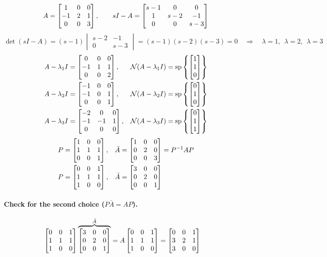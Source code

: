 \begin{example}
\[
A=\begin{bmatrix}1&0&0\\-1&2&1\\0&0&3\end{bmatrix},\qquad sI-A=\begin{bmatrix}s-1&0&0\\1&s-2&-1\\0&0&s-3\end{bmatrix}
\]
\[
\det(sI-A)=(s-1)\begin{vmatrix}s-2&-1\\0&s-3\end{vmatrix} = (s-1)(s-2)(s-3)=0
\quad\Rightarrow\quad \lambda=1,\ \ \lambda=2,\ \ \lambda=3
\]
\begin{align*}
A-\lambda_1 I &= \begin{bmatrix}0&0&0\\-1&1&1\\0&0&2\end{bmatrix}, & \mathcal{N}(A-\lambda_1 I)&=\operatorname{sp}\left\{\begin{bmatrix}1\\1\\0\end{bmatrix}\right\}\\
A-\lambda_2 I &= \begin{bmatrix}-1&0&0\\-1&0&1\\0&0&1\end{bmatrix}, & \mathcal{N}(A-\lambda_2 I)&=\operatorname{sp}\left\{\begin{bmatrix}0\\1\\0\end{bmatrix}\right\}\\
A-\lambda_3 I &= \begin{bmatrix}-2&0&0\\-1&-1&1\\0&0&0\end{bmatrix}, & \mathcal{N}(A-\lambda_3 I)&=\operatorname{sp}\left\{\begin{bmatrix}0\\1\\1\end{bmatrix}\right\}
\end{align*}
\begin{align*}
P&=\begin{bmatrix}1&0&0\\1&1&1\\0&0&1\end{bmatrix}, & \bar A&=\begin{bmatrix}1&0&0\\0&2&0\\0&0&3\end{bmatrix}=P^{-1}AP\\
P&=\begin{bmatrix}0&0&1\\1&1&1\\1&0&0\end{bmatrix}, & \bar A&=\begin{bmatrix}3&0&0\\0&2&0\\0&0&1\end{bmatrix}
\end{align*}
\paragraph{Check for the second choice ($P\bar A=AP$).}
\begin{align*}
\begin{bmatrix}0&0&1\\1&1&1\\1&0&0\end{bmatrix}\overbrace{\begin{bmatrix}3&0&0\\0&2&0\\0&0&1\end{bmatrix}}^{\bar A} &= A\begin{bmatrix}0&0&1\\1&1&1\\1&0&0\end{bmatrix}
= \begin{bmatrix}0&0&1\\3&2&1\\3&0&0\end{bmatrix}
\end{align*}
\end{example}


